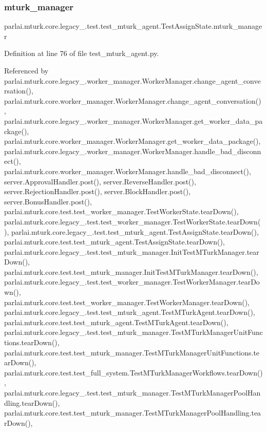 \subsubsection{\texorpdfstring{mturk\+\_\+manager}{mturk\_manager}}
{\footnotesize\ttfamily parlai.\+mturk.\+core.\+legacy\+\_.\+test.\+test\+\_\+mturk\+\_\+agent.\+Test\+Assign\+State.\+mturk\+\_\+manager}



Definition at line 76 of file test\+\_\+mturk\+\_\+agent.\+py.



Referenced by parlai.\+mturk.\+core.\+legacy\+\_.\+worker\+\_\+manager.\+Worker\+Manager.\+change\+\_\+agent\+\_\+conversation(), parlai.\+mturk.\+core.\+worker\+\_\+manager.\+Worker\+Manager.\+change\+\_\+agent\+\_\+conversation(), parlai.\+mturk.\+core.\+legacy\+\_.\+worker\+\_\+manager.\+Worker\+Manager.\+get\+\_\+worker\+\_\+data\+\_\+package(), parlai.\+mturk.\+core.\+worker\+\_\+manager.\+Worker\+Manager.\+get\+\_\+worker\+\_\+data\+\_\+package(), parlai.\+mturk.\+core.\+legacy\+\_.\+worker\+\_\+manager.\+Worker\+Manager.\+handle\+\_\+bad\+\_\+disconnect(), parlai.\+mturk.\+core.\+worker\+\_\+manager.\+Worker\+Manager.\+handle\+\_\+bad\+\_\+disconnect(), server.\+Approval\+Handler.\+post(), server.\+Reverse\+Handler.\+post(), server.\+Rejection\+Handler.\+post(), server.\+Block\+Handler.\+post(), server.\+Bonus\+Handler.\+post(), parlai.\+mturk.\+core.\+test.\+test\+\_\+worker\+\_\+manager.\+Test\+Worker\+State.\+tear\+Down(), parlai.\+mturk.\+core.\+legacy\+\_.\+test.\+test\+\_\+worker\+\_\+manager.\+Test\+Worker\+State.\+tear\+Down(), parlai.\+mturk.\+core.\+legacy\+\_.\+test.\+test\+\_\+mturk\+\_\+agent.\+Test\+Assign\+State.\+tear\+Down(), parlai.\+mturk.\+core.\+test.\+test\+\_\+mturk\+\_\+agent.\+Test\+Assign\+State.\+tear\+Down(), parlai.\+mturk.\+core.\+legacy\+\_.\+test.\+test\+\_\+mturk\+\_\+manager.\+Init\+Test\+M\+Turk\+Manager.\+tear\+Down(), parlai.\+mturk.\+core.\+test.\+test\+\_\+mturk\+\_\+manager.\+Init\+Test\+M\+Turk\+Manager.\+tear\+Down(), parlai.\+mturk.\+core.\+legacy\+\_.\+test.\+test\+\_\+worker\+\_\+manager.\+Test\+Worker\+Manager.\+tear\+Down(), parlai.\+mturk.\+core.\+test.\+test\+\_\+worker\+\_\+manager.\+Test\+Worker\+Manager.\+tear\+Down(), parlai.\+mturk.\+core.\+legacy\+\_.\+test.\+test\+\_\+mturk\+\_\+agent.\+Test\+M\+Turk\+Agent.\+tear\+Down(), parlai.\+mturk.\+core.\+test.\+test\+\_\+mturk\+\_\+agent.\+Test\+M\+Turk\+Agent.\+tear\+Down(), parlai.\+mturk.\+core.\+legacy\+\_.\+test.\+test\+\_\+mturk\+\_\+manager.\+Test\+M\+Turk\+Manager\+Unit\+Functions.\+tear\+Down(), parlai.\+mturk.\+core.\+test.\+test\+\_\+mturk\+\_\+manager.\+Test\+M\+Turk\+Manager\+Unit\+Functions.\+tear\+Down(), parlai.\+mturk.\+core.\+test.\+test\+\_\+full\+\_\+system.\+Test\+M\+Turk\+Manager\+Workflows.\+tear\+Down(), parlai.\+mturk.\+core.\+legacy\+\_.\+test.\+test\+\_\+mturk\+\_\+manager.\+Test\+M\+Turk\+Manager\+Pool\+Handling.\+tear\+Down(), parlai.\+mturk.\+core.\+test.\+test\+\_\+mturk\+\_\+manager.\+Test\+M\+Turk\+Manager\+Pool\+Handling.\+tear\+Down(), 